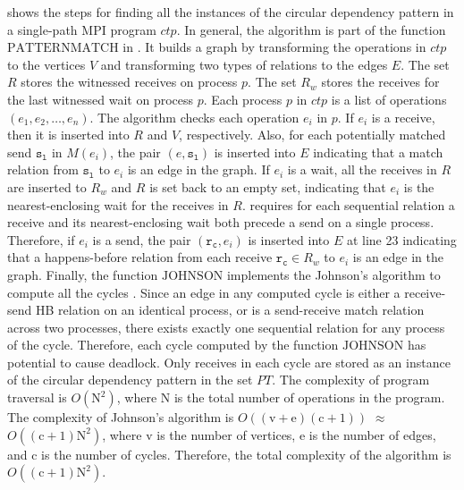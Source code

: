 shows the steps for finding all the instances of the circular dependency pattern in a single-path MPI program $\mathit{ctp}$. In general, the algorithm is part of the function $\mathrm{PATTERNMATCH}$ in . It builds a graph by transforming the operations in $\mathit{ctp}$ to the vertices $\mathit{V}$ and transforming two types of relations to the edges $\mathit{E}$. The set $\mathit{R}$ stores the witnessed receives on process $p$. The set $\mathit{R_w}$ stores the receives for the last witnessed wait on process $p$.
Each process $p$ in $\mathit{ctp}$ is a list of operations $(e_1, e_2, \dots, e_n)$. 
The algorithm checks each operation $e_i$ in $p$. 
If $\mathit{e_i}$ is a receive, then it is inserted into $\mathit{R}$ and $\mathit{V}$, respectively. Also, for each potentially matched send $\mathtt{s_l}$ in $\mathit{M}(\mathit{e_i})$, the pair $(\mathit{e},\mathtt{s_l})$ is inserted into $\mathit{E}$ indicating that a match relation from $\mathtt{s_l}$ to $\mathit{e_i}$ is an edge in the graph. If $\mathit{e_i}$ is a wait, all the receives in $\mathit{R}$ are inserted to $\mathit{R_w}$ and $\mathit{R}$ is set back to an empty set, indicating that $\mathit{e_i}$ is the nearest-enclosing wait for the receives in $\mathit{R}$.  requires for each sequential relation a receive and its nearest-enclosing wait both precede a send on a single process. Therefore, %
if $\mathit{e_i}$ is a send, the pair $(\mathtt{r_c},\mathit{e_i})$ is inserted into $\mathit{E}$ at line 23 indicating that a happens-before relation from each receive $\mathtt{r_c}\in\mathit{R_w}$ to $\mathit{e_i}$ is an edge in the graph. Finally, the function $\mathrm{JOHNSON}$ implements the Johnson's algorithm to compute all the cycles \cite{DBLP:journals/siamcomp/Johnson75}. Since an edge in any computed cycle is either a receive-send HB relation on an identical process, or is a send-receive match relation across two processes, there exists exactly one sequential relation for any process of the cycle. Therefore, each cycle computed by the function $\mathrm{JOHNSON}$ has potential to cause deadlock. Only receives in each cycle are stored as an instance of the circular dependency pattern in the set $\mathit{PT}$. The complexity of program traversal is $O(\mathrm{N}^2)$, where $\mathrm{N}$ is the total number of operations in the program. The complexity of Johnson's algorithm is $O((\mathrm{v}+\mathrm{e})(\mathrm{c}+1))$ $\approx$ $O((\mathrm{c}+1)\mathrm{N}^2)$, where $\mathrm{v}$ is the number of vertices, $\mathrm{e}$ is the number of edges, and $\mathrm{c}$ is the number of cycles. Therefore, the total complexity of the algorithm is $O((\mathrm{c}+1)\mathrm{N}^2)$.

